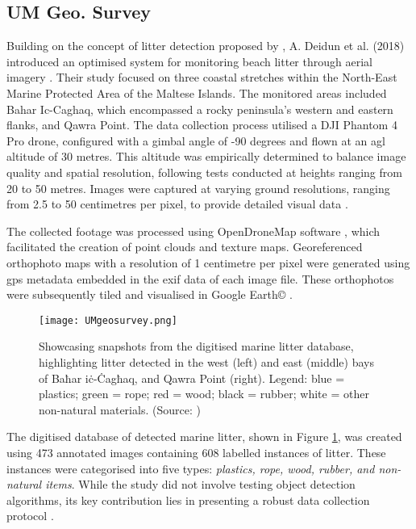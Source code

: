 \subsection{UM Geo. Survey}
\label{subsec:3_geosurvey}

Building on the concept of litter detection proposed by \cite{bdwdataset}, A. Deidun et al. (2018) introduced an optimised system for monitoring beach litter through aerial imagery \cite{umgeosurvey}. Their study focused on three coastal stretches within the North-East Marine Protected Area of the Maltese Islands. The monitored areas included Bahar Ic-Caghaq, which encompassed a rocky peninsula's western and eastern flanks, and Qawra Point. 
The data collection process utilised a DJI Phantom 4 Pro drone, configured with a gimbal angle of -90 degrees and flown at an \gls{agl} altitude of 30 metres. This altitude was empirically determined to balance image quality and spatial resolution, following tests conducted at heights ranging from 20 to 50 metres. Images were captured at varying ground resolutions, ranging from 2.5 to 50 centimetres per pixel, to provide detailed visual data \cite{umgeosurvey}.

The collected footage was processed using OpenDroneMap software \cite{OpenDroneMap}, which facilitated the creation of point clouds and texture maps. Georeferenced orthophoto maps with a resolution of 1 centimetre per pixel were generated using \gls{gps} metadata embedded in the \gls{exif} data of each image file. These orthophotos were subsequently tiled and visualised in Google Earth© \cite{umgeosurvey}.

\begin{figure}[!htbp]
    \centering
    \texttt{[image: UMgeosurvey.png]}
    \caption{Showcasing snapshots from the digitised marine litter database, highlighting litter detected in the west (left) and east (middle) bays of Baħar iċ-Ċagħaq, and Qawra Point (right). Legend: blue = plastics; green = rope; red = wood; black = rubber; white = other non-natural materials. (Source: \cite{umgeosurvey})}
    \label{fig:geosurvey}
\end{figure}

The digitised database of detected marine litter, shown in Figure \ref{fig:geosurvey}, was created using 473 annotated images containing 608 labelled instances of litter. These instances were categorised into five types: \textit{plastics, rope, wood, rubber, and non-natural items}. While the study did not involve testing object detection algorithms, its key contribution lies in presenting a robust data collection protocol \cite{umgeosurvey}.

